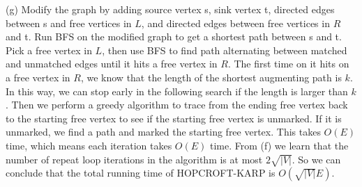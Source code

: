 \documentclass{article}
\begin{document}
(g) Modify the graph by adding source vertex s, sink vertex t, directed edges between s and free vertices in $L$, and directed edges between free vertices in $R$ and t. Run BFS on the modified graph to get a shortest path between s and t. Pick a free vertex in $L$, then use BFS to find path alternating between matched and unmatched edges until it hits a free vertex in $R$. The first time on it hits on a free vertex in $R$, we know that the length of the shortest augmenting path is $k$. In this way, we can stop early in the following search if the length is larger than $k$. Then we perform a greedy algorithm to trace from the ending free vertex back to the starting free vertex to see if the starting free vertex is unmarked. If it is unmarked, we find a path and marked the starting free vertex. This takes $O(E)$ time, which means each iteration takes $O(E)$ time. From (f) we learn that the number of repeat loop iterations in the algorithm is at most $2\sqrt{|V|}$. So we can conclude that the total running time of HOPCROFT-KARP is $O(\sqrt{|V|}E)$. \\
\end{document}
